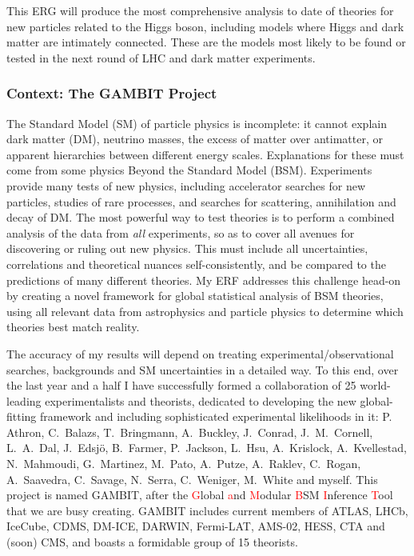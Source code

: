 \documentclass[11pt,oneside,twocolumn,a4paper]{article}
\author{Pat Scott}
\date{}
\begin{document}
This ERG will produce the most comprehensive analysis to date of theories for new particles related to the Higgs boson, including models where Higgs and dark matter are intimately connected.  These are the models most likely to be found or tested in the next round of LHC and dark matter experiments.

\subsubsection*{Context: The GAMBIT Project}

The Standard Model (SM) of particle physics is incomplete: it cannot explain dark matter (DM), neutrino masses, the excess of matter over antimatter, or apparent hierarchies between different energy scales.  Explanations for these must come from some physics Beyond the Standard Model (BSM).  Experiments provide many tests of new physics, including accelerator searches for new particles, studies of rare processes, and searches for scattering, annihilation and decay of DM.  The most powerful way to test theories is to perform a combined analysis of the data from \textit{all} experiments, so as to cover all avenues for discovering or ruling out new physics.  This must include all uncertainties, correlations and theoretical nuances self-consistently, and be compared to the predictions of many different theories.  My ERF addresses this challenge head-on by creating a novel framework for global statistical analysis of BSM theories, using all relevant data from astrophysics and particle physics to determine which theories best match reality.

The accuracy of my results will depend on treating experimental/observational searches, backgrounds and SM uncertainties in a detailed way.  To this end, over the last year and a half I have successfully formed a collaboration of 25 world-leading experimentalists and theorists, dedicated to developing the new global-fitting framework and including sophisticated experimental likelihoods in it: P. Athron, C.\ Balazs, T.\ Bringmann, A.\ Buckley, J.\ Conrad, J.\ M.\ Cornell, L.\ A.\ Dal, J.\ Edsj\"o, B.\ Farmer, P.\ Jackson, L.\ Hsu, A.\ Krislock, A.\ Kvellestad, N.\ Mahmoudi, G.\ Martinez, M.\ Pato, A.\ Putze, A.\ Raklev, C.\ Rogan, A.\ Saavedra, C.\ Savage, N.\ Serra, C.\ Weniger, M.\ White and myself.  This project is named GAMBIT, after the \textcolor{red}{G}lobal \textcolor{red}{a}nd \textcolor{red}{M}odular \textcolor{red}{B}SM \textcolor{red}{I}nference \textcolor{red}{T}ool that we are busy creating.  GAMBIT includes current members of ATLAS, LHCb, IceCube, CDMS, DM-ICE, DARWIN, Fermi-LAT, AMS-02, HESS, CTA and (soon) CMS, and boasts a formidable group of 15 theorists.
\end{document}

